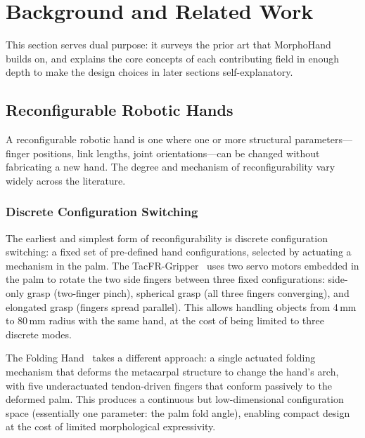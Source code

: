 \documentclass[journal]{IEEEtran}
\begin{document}
\section{Background and Related Work}
\label{sec:related}

This section serves dual purpose: it surveys the prior art that MorphoHand builds on,
and explains the core concepts of each contributing field in enough depth to make the
design choices in later sections self-explanatory.

\subsection{Reconfigurable Robotic Hands}
\label{sec:related_reconfig}

A reconfigurable robotic hand is one where one or more structural parameters---finger
positions, link lengths, joint orientations---can be changed without fabricating a new hand.
The degree and mechanism of reconfigurability vary widely across the literature.

\subsubsection{Discrete Configuration Switching}

The earliest and simplest form of reconfigurability is discrete configuration switching:
a fixed set of pre-defined hand configurations, selected by actuating a mechanism in the palm.
The TacFR-Gripper~\cite{tacfr2024} uses two servo motors embedded in the palm to rotate the
two side fingers between three fixed configurations: side-only grasp (two-finger pinch),
spherical grasp (all three fingers converging), and elongated grasp (fingers spread parallel).
This allows handling objects from 4\,mm to 80\,mm radius with the same hand, at the cost
of being limited to three discrete modes.

The Folding Hand~\cite{foldinghand2021} takes a different approach: a single actuated
folding mechanism that deforms the metacarpal structure to change the hand's arch,
with five underactuated tendon-driven fingers that conform passively to the deformed palm.
This produces a continuous but low-dimensional configuration space (essentially one parameter:
the palm fold angle), enabling compact design at the cost of limited morphological expressivity.
\end{document}
